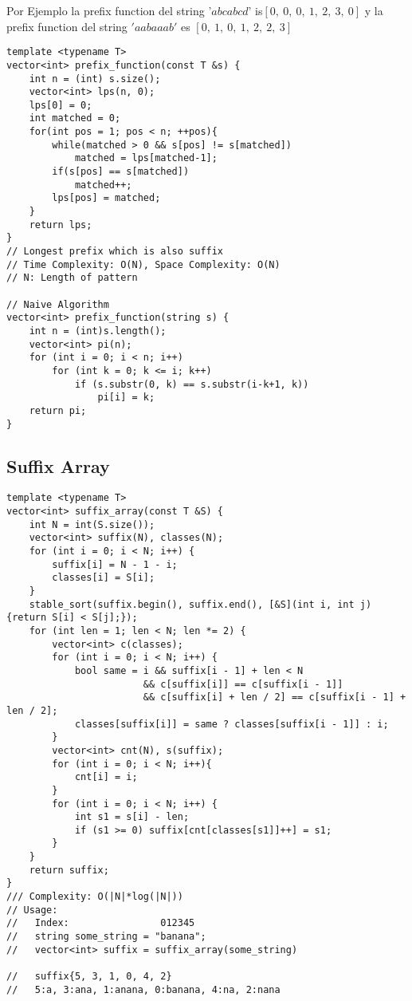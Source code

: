 \documentclass[10pt,letterpaper,twocolumn,twosided]{article}
\begin{document}
\newline

Por Ejemplo la prefix function del string '$abcabcd$' is$ \left[0,\:0,\:0,\:1,\:2,\:3,\:0\right]$ y la prefix function del string $'aabaaab'$ es $\left[0,\:1,\:0,\:1,\:2,\:2,\:3\right]$

\begin{lstlisting}
template <typename T>
vector<int> prefix_function(const T &s) {
    int n = (int) s.size();
    vector<int> lps(n, 0);
    lps[0] = 0;
    int matched = 0;
    for(int pos = 1; pos < n; ++pos){
        while(matched > 0 && s[pos] != s[matched])
            matched = lps[matched-1];
        if(s[pos] == s[matched])
            matched++;
        lps[pos] = matched;
    }
    return lps;
}
// Longest prefix which is also suffix
// Time Complexity: O(N), Space Complexity: O(N)
// N: Length of pattern

// Naive Algorithm
vector<int> prefix_function(string s) {
    int n = (int)s.length();
    vector<int> pi(n);
    for (int i = 0; i < n; i++)
        for (int k = 0; k <= i; k++)
            if (s.substr(0, k) == s.substr(i-k+1, k))
                pi[i] = k;
    return pi;
}
\end{lstlisting}

\subsection{Suffix Array}
\begin{lstlisting}
template <typename T>
vector<int> suffix_array(const T &S) {
    int N = int(S.size());
    vector<int> suffix(N), classes(N);
    for (int i = 0; i < N; i++) {
        suffix[i] = N - 1 - i;
        classes[i] = S[i];
    }
    stable_sort(suffix.begin(), suffix.end(), [&S](int i, int j) {return S[i] < S[j];});
    for (int len = 1; len < N; len *= 2) {
        vector<int> c(classes);
        for (int i = 0; i < N; i++) {
            bool same = i && suffix[i - 1] + len < N
                        && c[suffix[i]] == c[suffix[i - 1]]
                        && c[suffix[i] + len / 2] == c[suffix[i - 1] + len / 2];
            classes[suffix[i]] = same ? classes[suffix[i - 1]] : i;
        }
        vector<int> cnt(N), s(suffix);
        for (int i = 0; i < N; i++){
            cnt[i] = i;
        }
        for (int i = 0; i < N; i++) {
            int s1 = s[i] - len;
            if (s1 >= 0) suffix[cnt[classes[s1]]++] = s1;
        }
    }
    return suffix;
}
/// Complexity: O(|N|*log(|N|))
// Usage:
//   Index:                012345 
//   string some_string = "banana";
//   vector<int> suffix = suffix_array(some_string)

//   suffix{5, 3, 1, 0, 4, 2}
//   5:a, 3:ana, 1:anana, 0:banana, 4:na, 2:nana
\end{lstlisting}
\end{document}
